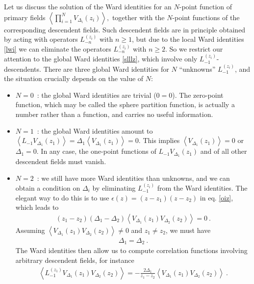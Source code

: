 \documentclass[12pt, a4paper, notitlepage, twoside]{report}
\numberwithin{equation}{section}
\theoremstyle{break}
\begin{document}
Let us discuss the solution of the Ward identities for an $N$-point function of primary fields
$
\left\langle \prod_{i=1}^N V_{\Delta_i}(z_i) \right\rangle ,
$
together with the $N$-point functions of the corresponding descendent fields.
Such descendent fields are in principle obtained by acting with operators $L_{-n}^{(z_i)}$ with $n\geq 1$, but due to the local Ward identities \eqref{lwi} we can eliminate the operators $L_{-n}^{(z_i)}$ with $n\geq 2$.
So we restrict our attention to the global Ward identities \eqref{slllz}, which involve only $L_{-1}^{(z_i)}$-descendents.
There are three global Ward identities for $N$ ``unknowns'' $L_{-1}^{(z_i)}$, and the situation crucially depends on the value of $N$:
\begin{itemize}
 \item $\boxed{N=0}$\ : the global Ward identities are trivial ($0=0$).
The zero-point function, which may be called the sphere partition function, is actually a number rather than a function, and carries no useful information.
\item $\boxed{N=1}$\ :  the global Ward identities amount to $\left\langle L_{-1}V_{\Delta_1}(z_1)\right\rangle  =\Delta_1 \left\langle V_{\Delta_1}(z_1)\right\rangle =0$.
This implies $\left\langle V_{\Delta_1}(z_1)\right\rangle=0$ or $\Delta_1=0$.
In any case, the one-point functions of $L_{-1}V_{\Delta_1}(z_1)$ and of all other descendent fields must vanish. 
\item $\boxed{N=2}$\ : we still have more Ward identities than unknowns, and we can obtain a condition on $\Delta_i$ by eliminating $L_{-1}^{(z_i)}$ from the Ward identities.
The elegant way to do this is to use $\epsilon(z)=(z-z_1)(z-z_2)$ in eq. \eqref{oiz}, which leads to 
\begin{align}
 (z_1-z_2)(\Delta_1-\Delta_2)\left\langle V_{\Delta_1}(z_1)V_{\Delta_2}(z_2)\right\rangle =0\ .
\end{align}
Assuming $\left\langle V_{\Delta_1}(z_1)V_{\Delta_2}(z_2)\right\rangle\neq 0$ and $z_1\neq z_2$, we must have 
\begin{align}
 \Delta_1 = \Delta_2 \ . 
\label{ded}
\end{align}
The Ward identities then allow us to compute correlation functions involving arbitrary descendent fields, for instance 
\begin{align}
  \left\langle L_{-1}^{(z_1)}V_{\Delta_1}(z_1)V_{\Delta_2}(z_2)\right\rangle= -\frac{2\Delta_1}{z_1-z_2}\left\langle V_{\Delta_1}(z_1)V_{\Delta_2}(z_2)\right\rangle \ .
\label{lzfz}
\end{align}

\end{itemize}
\end{document}
